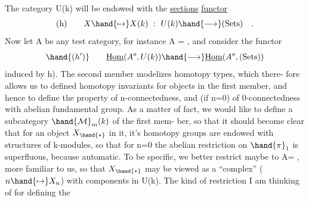 The category U(k) will be endowed with the \uline{sections} \uline{functor}
\[ \text{(h)} \qquad X \hand{\mapsto} X(k) \ : \ U(k) \hand{\longrightarrow} \text{(Sets)} \quad . \]
Now let A be any test category,  for instance A = \hand{$\Delta$},  and consider
the functor
\[ \hand{(h')} \qquad \underline{\mathrm{Hom}}(A^{o},U(k)) \hand{\longrightarrow} \underline{\mathrm{Hom}}(A^{o},\text{(Sets)}) \]
induced by h).  The second member modelizes homotopy types,  which there-%
fore allows us to defined homotopy invariants for objects in the first
member,  and hence to define the property of n-connectedness,  and (if
n=0)  of 0-connectedness with abelian fundamental group.  As a matter of
fact,  we would like to define a subcategory $\hand{\mathcal{M}}_m(k)$   of the first mem-%
ber,  so that it should become clear that for an object $X_{\hand{*}}$  in it, it's
homotopy groups are endowed with structures of k-modules,  so that for
n=0  the abelian restriction on $\hand{\pi}_1$ is superfluous,  because automatic.
To be specific,  we better restrict maybe to A= \hand{$\Delta$},  more familiar to
us,  so that $X_{\hand{*}}$ may be viewed as a ``complex''  ($n \hand{\mapsto} X_n$)  with components
in U(k).  The kind of restriction I am thinking of for defining the


